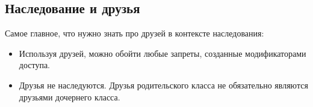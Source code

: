 \documentclass{article}
\begin{document}
\subsection*{Наследование и друзья}
Самое главное, что нужно знать про друзей в контексте наследования:
\begin{itemize}
\item Используя друзей, можно обойти любые запреты, созданные модификаторами доступа.
\item Друзья не наследуются. Друзья родительского класса не обязательно являются друзьями дочернего класса.
\end{itemize}
\end{document}
